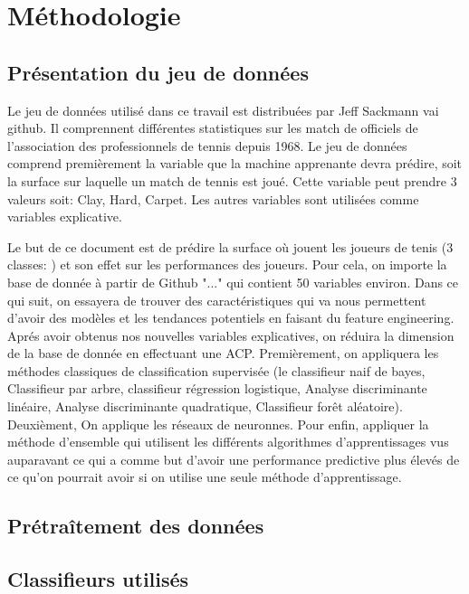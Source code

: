 \section{Méthodologie}

\subsection{Présentation du jeu de données}
Le jeu de données utilisé dans ce travail est distribuées par Jeff Sackmann vai github. Il comprennent différentes statistiques sur les match de officiels de l'association des professionnels de tennis depuis 1968. Le jeu de données comprend premièrement la variable que la machine apprenante devra prédire, soit la surface sur laquelle un match de tennis est joué. Cette variable peut prendre 3 valeurs soit: Clay, Hard, Carpet. Les autres variables sont utilisées comme variables explicative.






Le but de ce document est de prédire la surface où jouent les joueurs de tenis (3 classes: ) et son effet sur les performances des joueurs. Pour cela, on importe la base de donnée à partir de Github "..." qui contient 50 variables environ. Dans ce qui suit, on essayera de trouver des caractéristiques qui va nous permettent d'avoir des modèles et les tendances potentiels en faisant du feature engineering. Aprés avoir obtenus nos nouvelles variables explicatives, on réduira la dimension de la base de donnée en effectuant une ACP. Premièrement, on appliquera les méthodes classiques de classification supervisée (le classifieur naif de bayes, Classifieur par arbre, classifieur régression logistique, Analyse discriminante linéaire, Analyse discriminante quadratique, Classifieur forêt aléatoire). Deuxièment, On applique les réseaux de neuronnes. Pour enfin, appliquer la méthode d'ensemble qui  utilisent les différents algorithmes d'apprentissages vus auparavant ce qui a comme but d'avoir une performance predictive plus élevés de ce qu'on pourrait avoir si on utilise une seule méthode d'apprentissage.


\subsection{Prétraîtement des données}

\subsection{Classifieurs utilisés}


